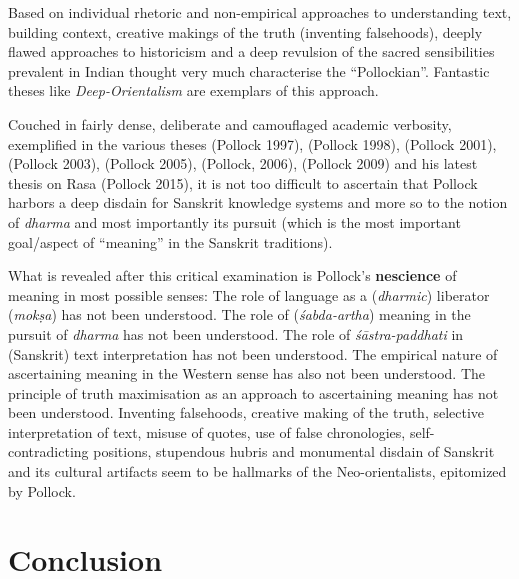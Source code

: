 Based on individual rhetoric and non-empirical approaches to understanding text, building context, creative makings of the truth (inventing falsehoods), deeply flawed approaches to historicism and a deep revulsion of the sacred sensibilities prevalent in Indian thought very much characterise the “Pollockian”. Fantastic theses like \textit{Deep-Orientalism} are exemplars of this approach.

Couched in fairly dense, deliberate and camouflaged academic verbosity, exemplified in the various theses (Pollock 1997), (Pollock 1998), (Pollock 2001),(Pollock 2003), (Pollock 2005), (Pollock, 2006), (Pollock 2009) and his latest thesis on Rasa (Pollock 2015), it is not too difficult to ascertain that Pollock harbors a deep disdain for Sanskrit knowledge systems and more so to the notion of \textit{dharma} and most importantly its pursuit (which is the most important goal/aspect of “meaning” in the Sanskrit traditions).

What is revealed after this critical examination is Pollock’s \textbf{nescience} of meaning in most possible senses: The role of language as a (\textit{dharmic}) liberator (\textit{mokṣa}) has not been understood. The role of (\textit{śabda-artha}) meaning in the pursuit of \textit{dharma} has not been understood. The role of \textit{śāstra-paddhati} in (Sanskrit) text interpretation has not been understood. The empirical nature of ascertaining meaning in the Western sense has also not been understood. The principle of truth maximisation as an approach to ascertaining meaning has not been understood. Inventing falsehoods, creative making of the truth, selective interpretation of text, misuse of quotes, use of false chronologies, self-contradicting positions, stupendous hubris and monumental disdain of Sanskrit and its cultural artifacts seem to be hallmarks of the Neo-orientalists, epitomized by Pollock.


\section*{Conclusion}

